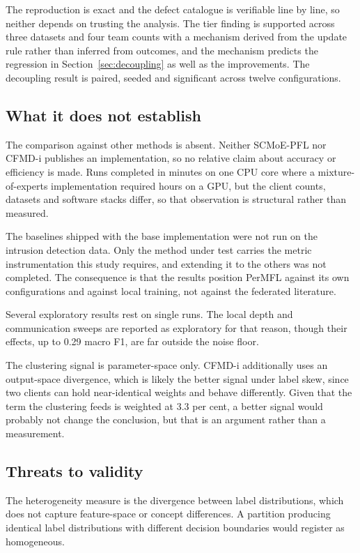 The reproduction is exact and the defect catalogue is verifiable line by line,
so neither depends on trusting the analysis. The tier finding is supported
across three datasets and four team counts with a mechanism derived from the
update rule rather than inferred from outcomes, and the mechanism predicts the
regression in Section~\ref{sec:decoupling} as well as the improvements. The
decoupling result is paired, seeded and significant across twelve
configurations.

\subsection{What it does not establish}

The comparison against other methods is absent. Neither SCMoE-PFL nor CFMD-i
publishes an implementation, so no relative claim about accuracy or efficiency
is made. Runs completed in minutes on one CPU core where a mixture-of-experts
implementation required hours on a GPU, but the client counts, datasets and
software stacks differ, so that observation is structural rather than measured.

The baselines shipped with the base implementation were not run on the intrusion
detection data. Only the method under test carries the metric instrumentation
this study requires, and extending it to the others was not completed. The
consequence is that the results position PerMFL against its own configurations
and against local training, not against the federated literature.

Several exploratory results rest on single runs. The local depth and
communication sweeps are reported as exploratory for that reason, though their
effects, up to 0.29 macro F1, are far outside the noise floor.

The clustering signal is parameter-space only. CFMD-i additionally uses an
output-space divergence, which is likely the better signal under label skew,
since two clients can hold near-identical weights and behave differently. Given
that the term the clustering feeds is weighted at 3.3 per cent, a better signal
would probably not change the conclusion, but that is an argument rather than a
measurement.

\subsection{Threats to validity}

The heterogeneity measure is the divergence between label distributions, which
does not capture feature-space or concept differences. A partition producing
identical label distributions with different decision boundaries would register
as homogeneous.

